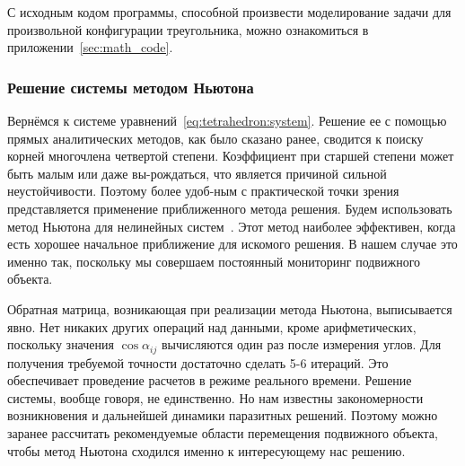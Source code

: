 \documentclass[../main.tex]{subfiles}
\begin{document}
С исходным кодом программы, способной произвести моделирование задачи для произвольной конфигурации треугольника, можно ознакомиться в приложении~\ref{sec:math_code}.

\subsubsection{Решение системы методом Ньютона}
Вернёмся к системе уравнений~\eqref{eq:tetrahedron:system}. Решение ее с помощью прямых аналитических методов, как было сказано ранее, сводится к поиску корней многочлена четвертой степени. Коэффициент при старшей степени может быть малым или даже вы-рождаться, что является причиной сильной неустойчивости. Поэтому более удоб-ным с практической точки зрения представляется применение приближенного метода решения. Будем использовать метод Ньютона для нелинейных систем~\cite{20, chapter 6}. Этот метод наиболее эффективен, когда есть хорошее начальное приближение для искомого решения. В нашем случае это именно так, поскольку мы совершаем постоянный мониторинг подвижного объекта.

Обратная матрица, возникающая при реализации метода Ньютона, выписывается явно. Нет никаких других операций над данными, кроме арифметических, поскольку значения $\cos \alpha_{ij}$ вычисляются один раз после измерения углов. Для получения требуемой точности достаточно сделать 5-6 итераций. Это обеспечивает проведение расчетов в режиме реального времени. Решение системы, вообще говоря, не единственно. Но нам известны закономерности возникновения и дальнейшей динамики паразитных решений. Поэтому можно заранее рассчитать рекомендуемые области перемещения подвижного объекта, чтобы метод Ньютона сходился именно к интересующему нас решению.
\end{document}
